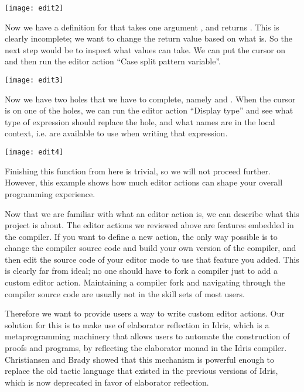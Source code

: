 \vspace{1em}
\texttt{[image: edit2]}

Now we have a definition for  that takes one argument , and
returns . This is clearly incomplete; we want to change
the return value based on what  is. So the next step would be to inspect
what values  can take. We can put the cursor on  and then run the
editor action ``Case split pattern variable''.

\vspace{1em}
\texttt{[image: edit3]}

Now we have two holes that we have to complete, namely  and
. When the cursor is on one of the holes, we can run the
editor action ``Display type'' and see what type of expression should replace
the hole, and what names are in the local context, i.e. are available to use
when writing that expression.

\vspace{1em}
\texttt{[image: edit4]}

Finishing this function from here is trivial, so we will not proceed further.
However, this example shows how much editor actions can shape your
overall programming experience.

Now that we are familiar with what an editor action is, we can describe what
this project is about. The editor actions we reviewed above are features embedded
in the compiler. If you want to define a new action, the only way possible is
to change the compiler source code and build your own version of the compiler,
and then edit the source code of your editor mode to use that feature you
added. This is clearly far from ideal; no one should have to fork a compiler
just to add a custom editor action. Maintaining a compiler fork and
navigating through the compiler source code are usually not in the skill sets
of most users.

Therefore we want to provide users a way to write custom editor actions. Our
solution for this is to make use of elaborator reflection\cite{elabref} in
Idris, which is a metaprogramming machinery that allows users to automate the
construction of proofs and programs, by reflecting the elaborator
monad\cite{idris} in the Idris compiler. Christiansen and Brady showed that
this mechanism is powerful enough to replace the old tactic
language\cite{elabref} that existed in the previous versions of Idris, which is
now deprecated in favor of elaborator reflection.

